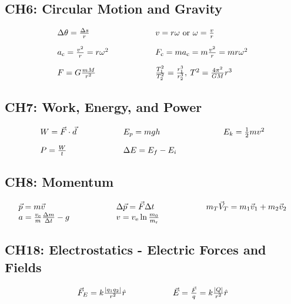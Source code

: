 \documentclass[12pt,a4paper]{article}
\begin{document}
\subsection{CH6: Circular Motion and Gravity}
\begin{align*}
\begin{array}{l@{\hspace{2cm}}l}
\Delta \theta=\frac{\Delta s}{r} & v=r \omega \text{ or } \omega=\frac{v}{r} \\[1em]
a_{\mathrm{c}}=\frac{v^2}{r} = r \omega^2 & F_{\mathrm{c}}=m a_{\mathrm{c}}=m \frac{v^2}{r}=m r \omega^2 \\[1em]
F=G \frac{m M}{r^2} & \frac{T_1^2}{T_2^2}=\frac{r_1^3}{r_2^3}, \: T^2=\frac{4 \pi^2}{G M} r^3
\end{array}
\end{align*}

\subsection{CH7: Work, Energy, and Power}

\begin{align*}
  \begin{array}{l@{\hspace{2cm}}l@{\hspace{2cm}}l}
    W = \vec{F} \cdot \vec{d} & E_p = mgh & E_k = \frac{1}{2}mv^2 \\[1em]
    P = \frac{W}{t} & \Delta E = E_f - E_i &
  \end{array}
\end{align*}

\subsection{CH8: Momentum}

\begin{align*}
  \begin{array}{l@{\hspace{2cm}}l@{\hspace{2cm}}l}
    \vec{p} = m\vec{v} & \Delta \vec{p} = \vec{F}\Delta t & m_T \vec{V}_T = m_1 \vec{v}_1 + m_2 \vec{v}_2 \\
    a=\frac{v_{\mathrm{e}}}{m} \frac{\Delta m}{\Delta t}-g & v=v_{\mathrm{e}} \ln \frac{m_0}{m_{\mathrm{r}}} &
  \end{array}
\end{align*}

\subsection{CH18: Electrostatics - Electric Forces and Fields}
\begin{align*}
\begin{array}{l@{\hspace{2cm}}l}
\vec{F}_E = k\frac{|q_1 q_2|}{r^2}\hat{r} & \vec{E} = \frac{\vec{F}}{q} = k\frac{|Q|}{r^2}\hat{r} \\[1em]
\end{array}
\end{align*}
\end{document}
